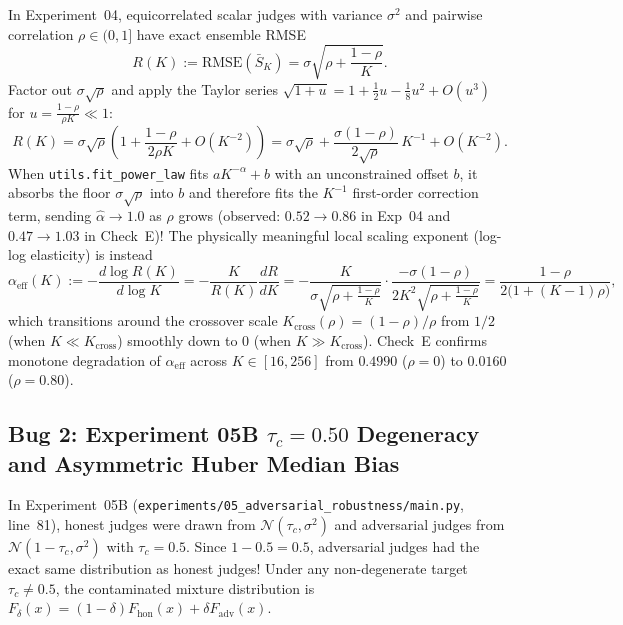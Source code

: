 \documentclass[11pt]{article}
\newcommand{\RMSE}{\mathrm{RMSE}}
\begin{document}
In Experiment~04, equicorrelated scalar judges with variance $\sigma^2$ and pairwise correlation $\rho \in (0,1]$ have exact ensemble RMSE
\begin{equation}
R(K) := \RMSE(\bar{S}_K) = \sigma\sqrt{\rho + \frac{1 - \rho}{K}}.
\end{equation}
Factor out $\sigma\sqrt{\rho}$ and apply the Taylor series $\sqrt{1 + u} = 1 + \frac{1}{2}u - \frac{1}{8}u^2 + O(u^3)$ for $u = \frac{1-\rho}{\rho K} \ll 1$:
\begin{equation}
R(K) = \sigma\sqrt{\rho}\left(1 + \frac{1-\rho}{2\rho K} + O(K^{-2})\right)
= \sigma\sqrt{\rho} + \frac{\sigma(1-\rho)}{2\sqrt{\rho}}\,K^{-1} + O(K^{-2}).
\end{equation}
When \texttt{utils.fit\_power\_law} fits $a K^{-\alpha} + b$ with an unconstrained offset $b$, it absorbs the floor $\sigma\sqrt{\rho}$ into $b$ and therefore fits the $K^{-1}$ first-order correction term, sending $\hat{\alpha} \to 1.0$ as $\rho$ grows (observed: $0.52 \to 0.86$ in Exp~04 and $0.47 \to 1.03$ in Check~E)! The physically meaningful local scaling exponent (log-log elasticity) is instead
\begin{equation}
\alpha_{\mathrm{eff}}(K)
:= -\frac{d \log R(K)}{d \log K}
= -\frac{K}{R(K)}\frac{d R}{d K}
= -\frac{K}{\sigma\sqrt{\rho + \frac{1-\rho}{K}}}\cdot \frac{-\sigma(1-\rho)}{2 K^2 \sqrt{\rho + \frac{1-\rho}{K}}}
= \boxed{\frac{1-\rho}{2\big(1 + (K-1)\rho\big)},}
\end{equation}
which transitions around the crossover scale $K_{\mathrm{cross}}(\rho) = (1-\rho)/\rho$ from $1/2$ (when $K \ll K_{\mathrm{cross}}$) smoothly down to $0$ (when $K \gg K_{\mathrm{cross}}$). Check~E confirms monotone degradation of $\alpha_{\mathrm{eff}}$ across $K \in [16, 256]$ from $0.4990$ ($\rho=0$) to $0.0160$ ($\rho=0.80$).

\subsection{\texorpdfstring{Bug 2: Experiment 05B $\tau_c = 0.50$ Degeneracy and Asymmetric Huber Median Bias}{Degenerate scores and asymmetric median bias}}
\label{sec:adversarial_bias}

In Experiment~05B (\texttt{experiments/05\_adversarial\_robustness/main.py}, line~81), honest judges were drawn from $\mathcal{N}(\tau_c, \sigma^2)$ and adversarial judges from $\mathcal{N}(1 - \tau_c, \sigma^2)$ with $\tau_c = 0.5$. Since $1 - 0.5 = 0.5$, adversarial judges had the exact same distribution as honest judges! Under any non-degenerate target $\tau_c \neq 0.5$, the contaminated mixture distribution is $F_\delta(x) = (1 - \delta) F_{\mathrm{hon}}(x) + \delta F_{\mathrm{adv}}(x)$.
\end{document}
